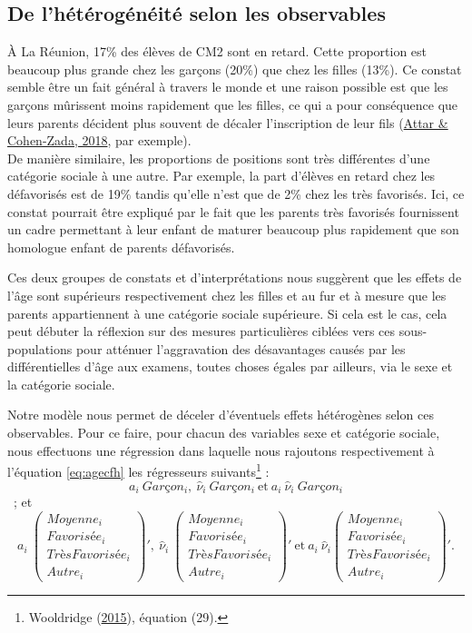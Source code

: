 \documentclass[
]{book}
\begin{document}
\hypertarget{agemodelsheterores}{%
\subsection{De l'hétérogénéité selon les observables}\label{agemodelsheterores}}

À La Réunion, 17\% des élèves de CM2 sont en retard. Cette proportion est beaucoup plus grande chez les garçons (20\%) que chez les filles (13\%). Ce constat semble être un fait général à travers le monde et une raison possible est que les garçons mûrissent moins rapidement que les filles, ce qui a pour conséquence que leurs parents décident plus souvent de décaler l'inscription de leur fils (\protect\hyperlink{ref-ATT:COH:18}{Attar \& Cohen-Zada, 2018}, par exemple).\\
De manière similaire, les proportions de positions sont très différentes d'une catégorie sociale à une autre. Par exemple, la part d'élèves en retard chez les défavorisés est de 19\% tandis qu'elle n'est que de 2\% chez les très favorisés. Ici, ce constat pourrait être expliqué par le fait que les parents très favorisés fournissent un cadre permettant à leur enfant de maturer beaucoup plus rapidement que son homologue enfant de parents défavorisés.

\quad Ces deux groupes de constats et d'interprétations nous suggèrent que les effets de l'âge sont supérieurs respectivement chez les filles et au fur et à mesure que les parents appartiennent à une catégorie sociale supérieure. Si cela est le cas, cela peut débuter la réflexion sur des mesures particulières ciblées vers ces sous-populations pour atténuer l'aggravation des désavantages causés par les différentielles d'âge aux examens, toutes choses égales par ailleurs, via le sexe et la catégorie sociale.

\quad Notre modèle nous permet de déceler d'éventuels effets hétérogènes selon ces observables. Pour ce faire, pour chacun des variables sexe et catégorie sociale, nous effectuons une régression dans laquelle nous rajoutons respectivement à l'équation \eqref{eq:agecfh} les régresseurs suivants\footnote{Wooldridge (\protect\hyperlink{ref-WOO:15}{2015}), équation (29).} :\\
\[a_i \ Garçon_i , \ \hat{\nu}_i \ Garçon_i \ \text{et} \  a_i \ \hat{\nu}_i \ Garçon_i\] ~;
et
\[a_i \ \begin{pmatrix} Moyenne_i \\ Favorisée_i \\ TrèsFavorisée_i \\ Autre_i \end{pmatrix}', \  \hat{\nu}_i \ \begin{pmatrix} Moyenne_i \\ Favorisée_i \\ TrèsFavorisée_i \\ Autre_i \end{pmatrix}' \ \text{et} \ a_i \ \hat{\nu}_i \begin{pmatrix} Moyenne_i \\ Favorisée_i \\ TrèsFavorisée_i \\ Autre_i \end{pmatrix}'.\]
\end{document}
